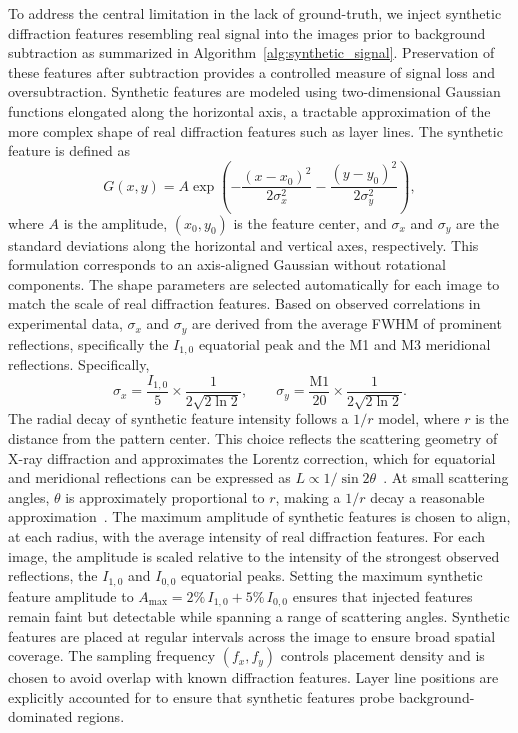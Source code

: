 \documentclass[iucr]{iucrjournals}
\begin{document}
To address the central limitation in the lack of ground-truth, we inject synthetic diffraction features resembling real signal into the images prior to background subtraction as summarized in Algorithm~\ref{alg:synthetic_signal}. Preservation of these features after subtraction provides a controlled measure of signal loss and oversubtraction. Synthetic features are modeled using two-dimensional Gaussian functions elongated along the horizontal axis, a tractable approximation of the more complex shape of real diffraction features such as layer lines. The synthetic feature is defined as
\begin{equation}
G(x, y) = A \exp\!\left(
-\frac{(x-x_0)^2}{2\sigma_x^2}
-\frac{(y-y_0)^2}{2\sigma_y^2}
\right),
\end{equation}
where $A$ is the amplitude, $(x_0, y_0)$ is the feature center, and $\sigma_x$ and $\sigma_y$ are the standard deviations along the horizontal and vertical axes, respectively. This formulation corresponds to an axis-aligned Gaussian without rotational components. The shape parameters are selected automatically for each image to match the scale of real diffraction features. Based on observed correlations in experimental data, $\sigma_x$ and $\sigma_y$ are derived from the average FWHM of prominent reflections, specifically the $I_{1,0}$ equatorial peak and the M1 and M3 meridional reflections. Specifically,
\begin{equation}
\sigma_x = \frac{I_{1,0}}{5} \times \frac{1}{2\sqrt{2\ln2}}, 
\qquad
\sigma_y = \frac{\mathrm{M1}}{20} \times \frac{1}{2\sqrt{2\ln2}}.
\end{equation}
The radial decay of synthetic feature intensity follows a $1/r$ model, where $r$ is the distance from the pattern center. This choice reflects the scattering geometry of X-ray diffraction and approximates the Lorentz correction, which for equatorial and meridional reflections can be expressed as $L \propto 1/\sin 2\theta$~\cite{Buerger1940}. At small scattering angles, $\theta$ is approximately proportional to $r$, making a $1/r$ decay a reasonable approximation~\cite{Denny1995}. The maximum amplitude of synthetic features is chosen to align, at each radius, with the average intensity of real diffraction features. For each image, the amplitude is scaled relative to the intensity of the strongest observed reflections, the $I_{1,0}$ and $I_{0,0}$ equatorial peaks. Setting the maximum synthetic feature amplitude to $A_{\mathrm{max}} = 2\%\, I_{1,0} + 5\%\, I_{0,0}$ ensures that injected features remain faint but detectable while spanning a range of scattering angles. Synthetic features are placed at regular intervals across the image to ensure broad spatial coverage. The sampling frequency $(f_x, f_y)$ controls placement density and is chosen to avoid overlap with known diffraction features. Layer line positions are explicitly accounted for to ensure that synthetic features probe background-dominated regions.
\end{document}
